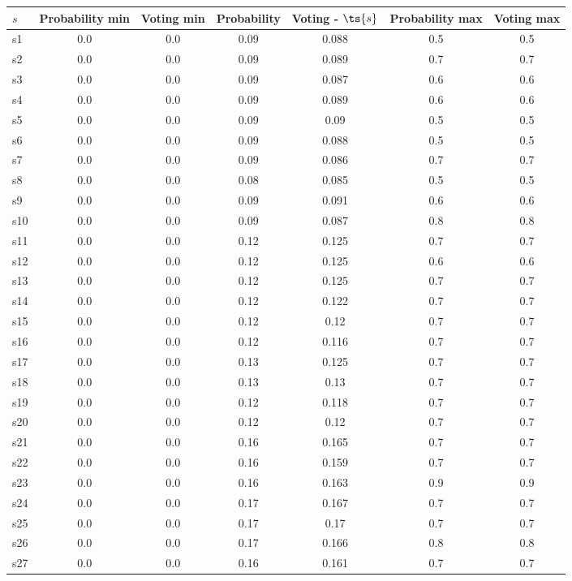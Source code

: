 \documentclass{article}
\begin{document}
\noindent\begin{tabular}{|l|c|c|c|c|c|c|}
\hline
$s$& Probability min & Voting min & Probability & Voting - $\ts{s}$ & Probability max & Voting max\\
\hline
s1 &0.0 & 0.0 & 0.09 & 0.088 & 0.5 & 0.5\\
\hline
s2 &0.0 & 0.0 & 0.09 & 0.089 & 0.7 & 0.7\\
\hline
s3 &0.0 & 0.0 & 0.09 & 0.087 & 0.6 & 0.6\\
\hline
s4 &0.0 & 0.0 & 0.09 & 0.089 & 0.6 & 0.6\\
\hline
s5 &0.0 & 0.0 & 0.09 & 0.09 & 0.5 & 0.5\\
\hline
s6 &0.0 & 0.0 & 0.09 & 0.088 & 0.5 & 0.5\\
\hline
s7 &0.0 & 0.0 & 0.09 & 0.086 & 0.7 & 0.7\\
\hline
s8 &0.0 & 0.0 & 0.08 & 0.085 & 0.5 & 0.5\\
\hline
s9 &0.0 & 0.0 & 0.09 & 0.091 & 0.6 & 0.6\\
\hline
s10 &0.0 & 0.0 & 0.09 & 0.087 & 0.8 & 0.8\\
\hline
s11 &0.0 & 0.0 & 0.12 & 0.125 & 0.7 & 0.7\\
\hline
s12 &0.0 & 0.0 & 0.12 & 0.125 & 0.6 & 0.6\\
\hline
s13 &0.0 & 0.0 & 0.12 & 0.125 & 0.7 & 0.7\\
\hline
s14 &0.0 & 0.0 & 0.12 & 0.122 & 0.7 & 0.7\\
\hline
s15 &0.0 & 0.0 & 0.12 & 0.12 & 0.7 & 0.7\\
\hline
s16 &0.0 & 0.0 & 0.12 & 0.116 & 0.7 & 0.7\\
\hline
s17 &0.0 & 0.0 & 0.13 & 0.125 & 0.7 & 0.7\\
\hline
s18 &0.0 & 0.0 & 0.13 & 0.13 & 0.7 & 0.7\\
\hline
s19 &0.0 & 0.0 & 0.12 & 0.118 & 0.7 & 0.7\\
\hline
s20 &0.0 & 0.0 & 0.12 & 0.12 & 0.7 & 0.7\\
\hline
s21 &0.0 & 0.0 & 0.16 & 0.165 & 0.7 & 0.7\\
\hline
s22 &0.0 & 0.0 & 0.16 & 0.159 & 0.7 & 0.7\\
\hline
s23 &0.0 & 0.0 & 0.16 & 0.163 & 0.9 & 0.9\\
\hline
s24 &0.0 & 0.0 & 0.17 & 0.167 & 0.7 & 0.7\\
\hline
s25 &0.0 & 0.0 & 0.17 & 0.17 & 0.7 & 0.7\\
\hline
s26 &0.0 & 0.0 & 0.17 & 0.166 & 0.8 & 0.8\\
\hline
s27 &0.0 & 0.0 & 0.16 & 0.161 & 0.7 & 0.7\\

\end{tabular}
\end{document}

